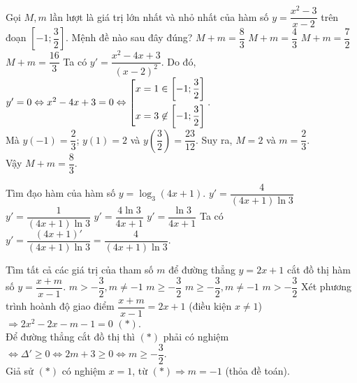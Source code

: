 \begin{ex}%
	Gọi $M,m$ lần lượt là giá trị lớn nhất và nhỏ nhất của hàm số $y=\dfrac{x^2-3}{x-2}$ trên đoạn $\left[-1;\dfrac{3}{2}\right]$. Mệnh đề nào sau đây đúng?
	\choice
	{\True $M+m=\dfrac{8}{3}$}
	{$M+m=\dfrac{4}{3}$}
	{$M+m=\dfrac{7}{2}$}
	{$M+m=\dfrac{16}{3}$}
	\loigiai
	{
		Ta có $y'=\dfrac{x^2-4x+3}{(x-2)^2}$. Do đó, $y'=0 \Leftrightarrow x^2-4x+3=0 \Leftrightarrow \left[\begin{aligned}&x=1 \in \left[-1;\dfrac{3}{2}\right]\\&x=3 \not \in \left[-1;\dfrac{3}{2}\right]\end{aligned}\right.$.\\
		Mà $y(-1)=\dfrac{2}{3}$; $y(1)=2$ và $y\left(\dfrac{3}{2}\right)=\dfrac{23}{12}$. Suy ra, $M=2$ và $m=\dfrac{2}{3}$.\\
		Vậy $M+m=\dfrac{8}{3}$.
	}
\end{ex}

\begin{ex}%
	Tìm đạo hàm của hàm số $y=\log_3 (4x+1)$.
	\choice
	{\True $y'=\dfrac{4}{(4x+1)\ln3}$}
	{$y'=\dfrac{1}{(4x+1)\ln3}$}
	{$y'=\dfrac{4\ln3}{4x+1}$}
	{$y'=\dfrac{\ln3}{4x+1}$}
	\loigiai
	{Ta có 
		$y'=\dfrac{(4x+1)'}{(4x+1)\ln3}=\dfrac{4}{(4x+1)\ln3}$.
	}
\end{ex}

\begin{ex}%
	Tìm tất cả các giá trị của tham số $m$ để đường thẳng $y=2x+1$ cắt đồ thị hàm số $y=\dfrac{x+m}{x-1}$.
	\choice
	{$m>-\dfrac{3}{2}, m\ne -1$}
	{\True $m \ge -\dfrac{3}{2}$}
	{$m\ge -\dfrac{3}{2}, m \ne -1$}
	{$m>-\dfrac{3}{2}$}
	\loigiai
	{
		Xét phương trình hoành độ giao điểm $\dfrac{x+m}{x-1}=2x+1$ (điều kiện $x \ne 1$)\\
		$\Rightarrow 2x^2-2x-m-1=0$ $(*)$.\\
		Để đường thẳng cắt đồ thị thì $(*)$ phải có nghiệm $ \Leftrightarrow \Delta' \ge 0 \Leftrightarrow 2m+3 \ge 0 \Leftrightarrow m \ge -\dfrac{3}{2}$.\\
		Giả sử $(*)$ có nghiệm $x=1$, từ $(*) \Rightarrow m=-1$ (thỏa đề toán).
	}
\end{ex}

